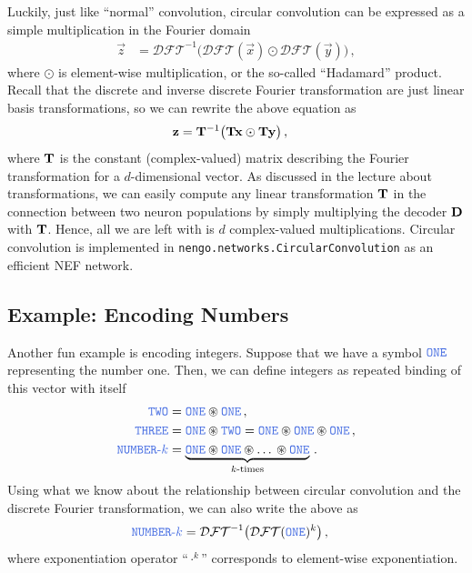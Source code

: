 \documentclass[10pt,letterpaper,oneside]{article}
\begin{document}
Luckily, just like \enquote{normal} convolution, circular convolution can be expressed as a simple multiplication in the Fourier domain
\begin{align*}
	\vec z &= \mathcal{DFT}^{-1} \big( \mathcal{DFT}(\vec x) \odot \mathcal{DFT}(\vec y) \big) \,,
\end{align*}
where $\odot$ is element-wise multiplication, or the so-called \enquote{Hadamard} product. Recall that the discrete and inverse discrete Fourier transformation are just linear basis transformations, so we can rewrite the above equation as
\begin{align*}
	{\mathbf{z}} &= {\mathbf{T}}^{-1} \big( {\mathbf{T}} {\mathbf{x}} \odot {\mathbf{T}} {\mathbf{y}} \big) \,,
\end{align*}
where ${\mathbf{T}}$ is the constant (complex-valued) matrix describing the Fourier transformation for a $d$-dimensional vector. As discussed in the lecture about transformations, we can easily compute any linear transformation ${\mathbf{T}}$ in the connection between two neuron populations by simply multiplying the decoder ${\mathbf{D}}$ with ${\mathbf{T}}$. Hence, all we are left with is $d$ complex-valued multiplications. Circular convolution is implemented in \texttt{nengo.networks.CircularConvolution} as an efficient NEF network.

\subsection{Example: Encoding Numbers}

Another fun example is encoding integers. Suppose that we have a symbol $\Obj{ONE}$ representing the number one. Then, we can define integers as repeated binding of this vector with itself
\begin{align*}
	\Obj{TWO} &= \Obj{ONE} \CC \Obj{ONE} \,, \\
	\Obj{THREE} &= \Obj{ONE} \CC \Obj{TWO} = \Obj{ONE} \CC \Obj{ONE} \CC \Obj{ONE} \,, \\
	\Obj{NUMBER\text{-$k$}} &= \underbrace{\Obj{ONE} \CC \Obj{ONE} \CC \text{\textellipsis} \CC \Obj{ONE}}_{\text{$k$-times}} \,.
\end{align*}
Using what we know about the relationship between circular convolution and the discrete Fourier transformation, we can also write the above as
\begin{align*}
	\Obj{NUMBER\text{-$k$}} &= \mathcal{DFT}^{-1} \big( \mathcal{DFT}(\Obj{ONE})^k \big) \,,
\end{align*}
where exponentiation operator \enquote{$\cdot^k$} corresponds to element-wise exponentiation.
\end{document}
